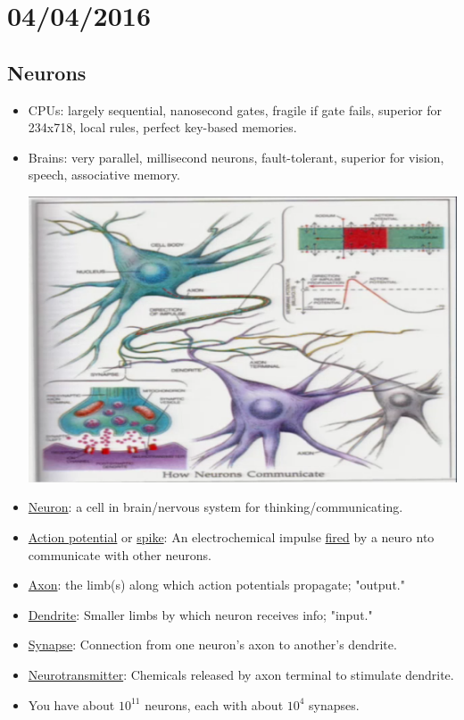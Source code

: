 \documentclass[10pt]{article}
\begin{document}
\section*{04/04/2016}
\subsection*{Neurons}
\begin{itemize}
	\item CPUs: largely sequential, nanosecond gates, fragile if gate fails, superior for 234x718, local rules, perfect key-based memories.
	\item Brains: very parallel, millisecond neurons, fault-tolerant, superior for vision, speech, associative memory.
	\begin{center}
		\includegraphics[scale=0.5]{../images/neurons}
	\end{center}
	\item \underline{Neuron}: a cell in brain/nervous system for thinking/communicating.
	\item \underline{Action potential} or \underline{spike}: An electrochemical impulse \underline{fired} by a neuro nto communicate with other neurons.
	\item \underline{Axon}: the limb(s) along which action potentials propagate; "output."
	\item \underline{Dendrite}: Smaller limbs by which neuron receives info; "input."
	\item \underline{Synapse}: Connection from one neuron's axon to another's dendrite.
	\item \underline{Neurotransmitter}: Chemicals released by axon terminal to stimulate dendrite.
	\item You have about $10^{11}$ neurons, each with about $10^{4}$ synapses.

\end{itemize}
\end{document}
